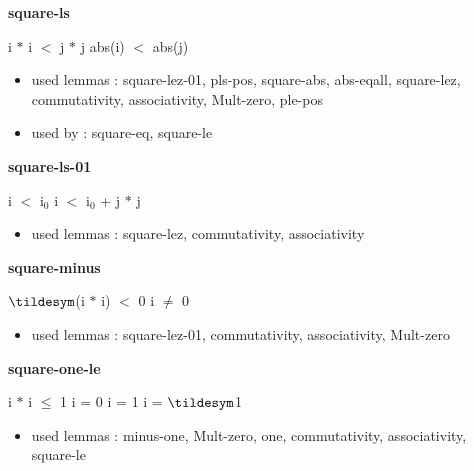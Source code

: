 \documentclass[a4paper]{article}
\begin{document}
\medskip

\bigskip

{\large\bf square-ls}

\medskip

 \Fol i $*$ i $<$ j $*$ j \Equiv abs(i) $<$ abs(j)

\begin{itemize}


\item       used lemmas  : square-lez-01, pls-pos, square-abs, abs-eqall, square-lez, commutativity, associativity, Mult-zero, ple-pos
\item       used by      : square-eq, square-le

\end{itemize}

\medskip

\bigskip

{\large\bf square-ls-01}

\medskip

 \Fol i $<$ $\mbox{i}_{0}$ \Imp i $<$ $\mbox{i}_{0}$ + j $*$ j

\begin{itemize}


\item       used lemmas  : square-lez, commutativity, associativity

\end{itemize}

\medskip

\bigskip

{\large\bf square-minus}

\medskip

 \Fol $\tildesym$(i $*$ i) $<$ 0 \Equiv i $\neq$ 0

\begin{itemize}


\item       used lemmas  : square-lez-01, commutativity, associativity, Mult-zero

\end{itemize}

\medskip

\bigskip

{\large\bf square-one-le}

\medskip

 \Fol i $*$ i $\le$ 1 \Equiv i = 0 \Or i = 1 \Or i = $\tildesym$1

\begin{itemize}


\item       used lemmas  : minus-one, Mult-zero, one, commutativity, associativity, square-le

\end{itemize}
\end{document}
